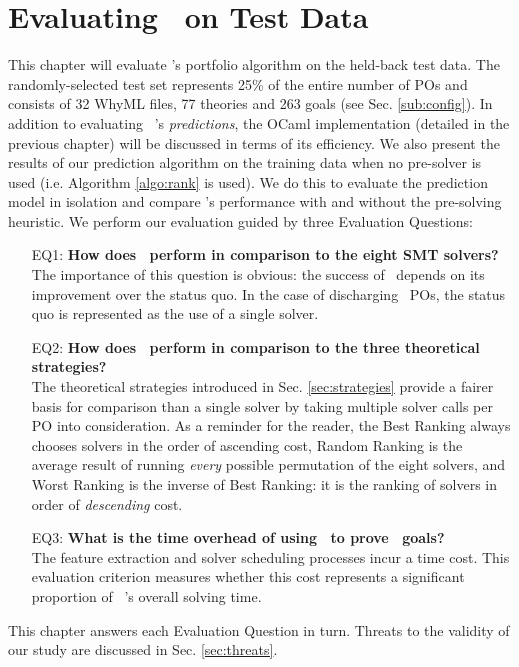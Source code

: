 \chapter{Evaluating \where~on Test Data}%
\thispagestyle{nohead}
\label{Evaluation} 

This chapter will evaluate \where's portfolio algorithm on the held-back test data.
The randomly-selected test set represents 25\% of the entire number of POs and consists of 32 WhyML files, 77 theories and 263 goals  (see Sec. \ref{sub:config}).
In addition to evaluating \where~'s \textit{predictions}, the OCaml implementation (detailed in the previous chapter) will be discussed in terms of its efficiency.   
We also present the results of our prediction algorithm on the training data when no pre-solver is used (i.e. Algorithm \ref{algo:rank} is used).
We do this to evaluate the prediction model in isolation and compare \where's performance with and without the pre-solving heuristic.
We perform our evaluation guided by three Evaluation Questions:
\begin{itemize}
	\item[EQ1:] \textbf{How does \where~perform in comparison to the eight SMT solvers?}\\
	The importance of this question is obvious: the success of \where~depends on its improvement over the status quo. In the case of discharging \why~POs, the status quo is represented as the use of a single solver.
	\item[EQ2:] \textbf{How does \where~perform in comparison to the three theoretical strategies?}\\
	The theoretical strategies introduced in Sec. \ref{sec:strategies} provide a fairer basis for comparison than a single solver by taking multiple solver calls per PO into consideration.
	As a reminder for the reader, the \textsf{Best Ranking} always chooses solvers in the order of ascending cost, \textsf{Random Ranking} is the average result of running \textit{every} possible permutation of the eight solvers, and \textsf{Worst Ranking} is the inverse of \textsf{Best Ranking}: it is the ranking of solvers in order of \textit{descending} cost. 
	\item[EQ3:] \textbf{What is the time overhead of using \where~to prove \why~goals?}\\
	The feature extraction and solver scheduling processes incur a time cost. This evaluation criterion measures whether this cost represents a significant proportion of \where~'s overall solving time.    	
\end{itemize}
This chapter answers each Evaluation Question in turn.
Threats to the validity of our study are discussed in Sec. \ref{sec:threats}. 

